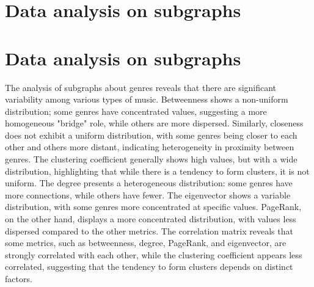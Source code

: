 \section{Data analysis on subgraphs}
\section{Data analysis on subgraphs}
The analysis of subgraphs about genres reveals that there are significant variability among various types of music. 
Betweenness shows a non-uniform distribution; some genres have concentrated values, suggesting a more homogeneous "bridge" role, while others are more dispersed. 
Similarly, closeness does not exhibit a uniform distribution, with some genres being closer to each other and others more distant, indicating heterogeneity in proximity between genres. 
The clustering coefficient generally shows high values, but with a wide distribution, highlighting that while there is a tendency to form clusters, it is not uniform. The degree presents a heterogeneous distribution: some genres have more connections, while others have fewer. 
The eigenvector shows a variable distribution, with some genres more concentrated at specific values. PageRank, on the other hand, displays a more concentrated distribution, with values less dispersed compared to the other metrics. 
The correlation matrix reveals that some metrics, such as betweenness, degree, PageRank, and eigenvector, are strongly correlated with each other, while the clustering coefficient appears less correlated, suggesting that the tendency to form clusters depends on distinct factors.
